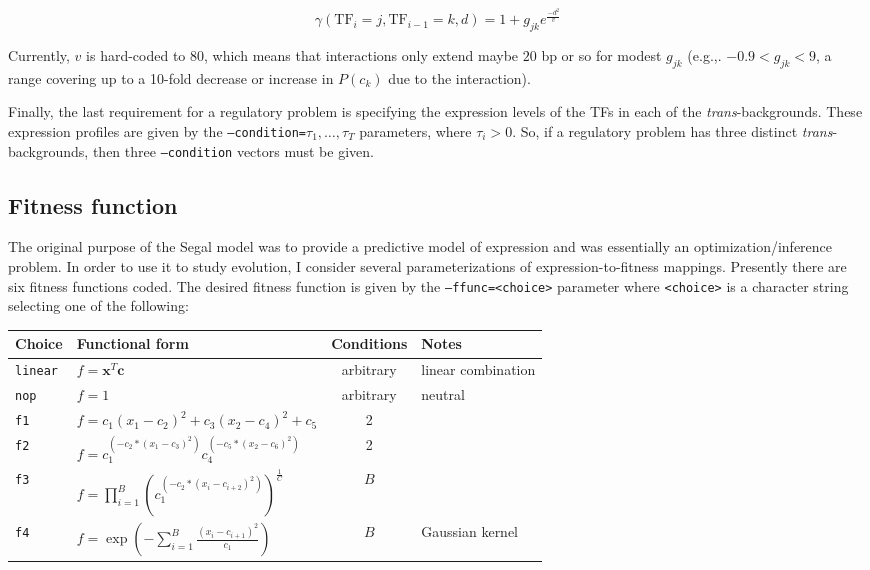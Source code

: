 \documentclass[11pt]{article}
\begin{document}
\begin{displaymath}
\gamma(\mathrm{TF}_{i}=j,\mathrm{TF}_{i-1}=k,d) = 1+g_{jk}e^{\frac{-d^2}{v}}
\end{displaymath}

\noindent Currently, $v$ is hard-coded to $80$, which means that interactions only extend maybe $20$ bp or so for modest $g_{jk}$ (e.g.,. $-0.9 < g_{jk} < 9$, a range covering up to a 10-fold decrease or increase in $P(c_k)$ due to the interaction). 

Finally, the last requirement for a regulatory problem is specifying the expression levels of the TFs in each of the \emph{trans}-backgrounds. These expression profiles are given by the \texttt{--condition=}$\tau_1,\ldots,\tau_T$ parameters, where $\tau_i > 0$. So, if a regulatory problem has three distinct \emph{trans}-backgrounds, then three \texttt{--condition} vectors must be given.

\subsection*{Fitness function}

The original purpose of the Segal model was to provide a predictive model of expression and was essentially an optimization/inference problem. In order to use it to study evolution, I consider several parameterizations of expression-to-fitness mappings. Presently there are six fitness functions coded. The desired fitness function is given by the \texttt{--ffunc=<choice>} parameter where \texttt{<choice>} is a character string selecting one of the following:

\begin{tabular}{l|p{6cm}|c|p{4cm}}
Choice & Functional form & Conditions & Notes \\
\hline
\texttt{linear} & $f = \mathbf{x}^{T} \mathbf{c}$ & arbitrary & linear combination\\
\texttt{nop} & $f = 1$ & arbitrary & neutral\\
\texttt{f1} & $f = c_1 (x_1-c_2)^2 + c_3 (x_2-c_4)^2 + c_5$ & 2 & \\
\texttt{f2} & $f = c_1^{(-c_2*(x_1-c_3)^2)} c_4^{(-c_5*(x_2-c_6)^2)}$ & 2 & \\
\texttt{f3} & $f = \prod_{i=1}^{B} (c_1^(-c_2*(x_i-c_{i+2})^2))^{\frac{1}{C}}$ & $B$ & \\
\texttt{f4} & $f = \exp(-\sum_{i=1}^{B}\frac{(x_i-c_{i+1})^2}{c_1})$ & $B$ & Gaussian kernel \\
\end{tabular}
\end{document}
